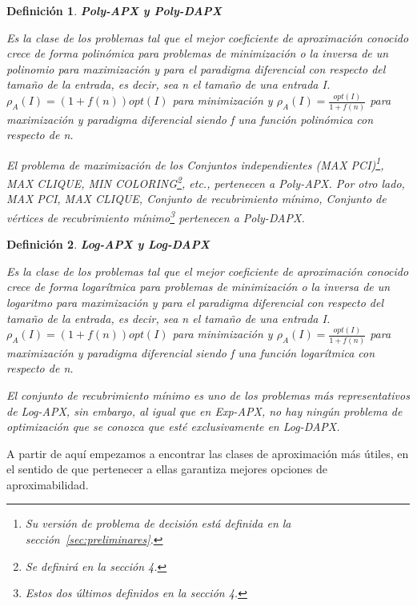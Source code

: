 \documentclass[a4paper,12pt,titlepage]{article}
\newtheorem{defi}{Definici\'on}[section]
\begin{document}
\begin{defi}

\textbf{Poly-APX y Poly-DAPX}

Es la clase de los problemas tal que el mejor coeficiente de aproximaci\'on conocido crece de forma polin\'omica para problemas de minimizaci\'on o la inversa de un polinomio para maximizaci\'on y para el paradigma diferencial con respecto del tamaño de la entrada, es decir, sea n el tamaño de una entrada I.
$\rho_{A}(I)=(1+f(n))opt(I)$ para minimizaci\'on y $\rho_{A}(I)=\frac{opt(I)}{1+f(n)}$ para maximizaci\'on y paradigma diferencial siendo f una funci\'on polin\'omica con respecto de n.

El problema de maximizaci\'on de los Conjuntos independientes (MAX PCI)\footnote{Su versi\'on de problema de decisi\'on est\'a definida en la secci\'on~\ref{sec:preliminares}.}, MAX CLIQUE, MIN COLORING\footnote{Se definir\'a en la secci\'on 4.}, etc., pertenecen a Poly-APX. Por otro lado, MAX PCI, MAX CLIQUE, Conjunto de recubrimiento m\'inimo, Conjunto de v\'ertices de recubrimiento m\'inimo\footnote{Estos dos \'ultimos definidos en la secci\'on 4.} pertenecen a Poly-DAPX.

\end{defi}

\begin{defi}

\textbf{Log-APX y Log-DAPX}

Es la clase de los problemas tal que el mejor coeficiente de aproximaci\'on conocido crece de forma logar\'itmica para problemas de minimizaci\'on o la inversa de un logaritmo para maximizaci\'on y para el paradigma diferencial con respecto del tamaño de la entrada, es decir, sea n el tamaño de una entrada I.
$\rho_{A}(I)=(1+f(n))opt(I)$ para minimizaci\'on y $\rho_{A}(I)=\frac{opt(I)}{1+f(n)}$ para maximizaci\'on y paradigma diferencial siendo f una funci\'on logar\'itmica con respecto de n.

El conjunto de recubrimiento m\'inimo es uno de los problemas m\'as representativos de Log-APX, sin embargo, al igual que en Exp-APX, no hay ning\'un problema de optimizaci\'on que se conozca que est\'e exclusivamente en Log-DAPX.

\end{defi}

A partir de aqu\'i empezamos a encontrar las clases de aproximaci\'on m\'as \'utiles, en el sentido de que pertenecer a ellas garantiza mejores opciones de aproximabilidad.
\end{document}
